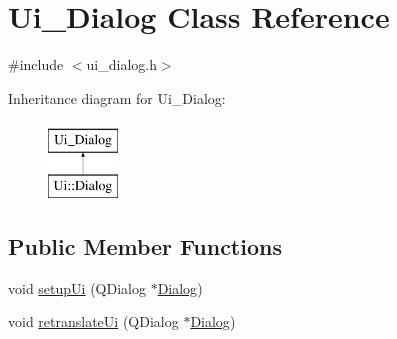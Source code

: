 \hypertarget{class_ui___dialog}{}\section{Ui\+\_\+\+Dialog Class Reference}
\label{class_ui___dialog}


{\ttfamily \#include $<$ui\+\_\+dialog.\+h$>$}

Inheritance diagram for Ui\+\_\+\+Dialog\+:\begin{figure}[H]
\begin{center}
\leavevmode
\includegraphics[height=2.000000cm]{class_ui___dialog}
\end{center}
\end{figure}
\subsection*{Public Member Functions}
\begin{DoxyCompactItemize}
\item 
void \hyperlink{class_ui___dialog_a4f6a478c3ecdafabffb17b39cb26444a}{setup\+Ui} (Q\+Dialog $\ast$\hyperlink{class_dialog}{Dialog})
\item 
void \hyperlink{class_ui___dialog_afa0ccb6f716ca6178260522a193c250e}{retranslate\+Ui} (Q\+Dialog $\ast$\hyperlink{class_dialog}{Dialog})
\end{DoxyCompactItemize}

